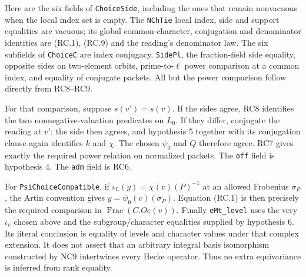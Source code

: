 Here are the six fields of \texttt{ChoiceSide}, including the ones that
remain nonvacuous when the local index set is empty.
The \texttt{NChTie} local index, side and support equalities are vacuous;
its global common-character, conjugation and denominator identities
are (RC.1), (RC.9) and the reading's denominator law.
The six subfields of \texttt{ChoiceC} are index conjugacy,
\texttt{SidePl}, the fraction-field side equality, opposite sides on
two-element orbits, prime-to-$\ell$ power comparison at a common index,
and equality of conjugate packets. All but the power comparison follow
directly from RC8--RC9.

For that comparison, suppose $s(v')=s(v)$. If the sides agree, RC8
identifies the two nonnegative-valuation predicates on $L_0$.
If they differ, conjugate the reading at $v'$; the side then agrees,
and hypothesis 5 together with its conjugation clause again identifies
$k$ and $\chi$. The chosen $\psi_0$ and $Q$ therefore agree.
RC7 gives exactly the required power relation on normalized packets.
The \texttt{off} field is hypothesis 4. The \texttt{adm} field is RC6.

For \texttt{PsiChoiceCompatible}, if
$\iota_L(y)=\chi(v)(P)^{-1}$ at an allowed Frobenius $\sigma_P$,
the Artin convention gives $y=\psi_0(v)(\sigma_P)$.
Equation (RC.1) is then precisely the required comparison in
$\operatorname{Frac}(C.Oe(v))$.
Finally \texttt{eMt\_level} uses the very $\iota_v$ chosen above and
the subgroup/character equalities supplied by hypothesis 6.
Its literal conclusion is equality of levels and character values
under that complex extension. It does not assert that an arbitrary
integral basis isomorphism constructed by NC9 intertwines every Hecke
operator. Thus no extra equivariance is inferred from rank equality.

